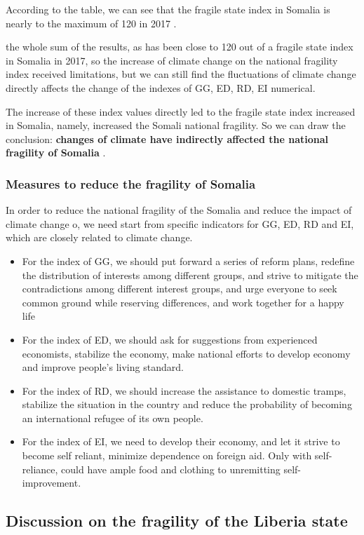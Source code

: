 \documentclass{mcmthesis}
\begin{document}
According to the table, we can see that the fragile state index in Somalia is nearly to the maximum of 120 in 2017 .

the whole sum of the results, as has been close to 120 out of a fragile state index in Somalia in 2017, so the increase of climate change on the national fragility index received limitations, but we can still find the fluctuations of climate change directly affects the change of the indexes of GG, ED, RD, EI numerical. 

 The increase of these index values directly led to the fragile state index increased in Somalia, namely, increased the Somali national fragility. So we can draw the conclusion: \textbf{changes of climate have indirectly affected the national fragility of Somalia} .

\subsubsection{Measures to reduce the fragility of Somalia}
In order to reduce the national fragility of the Somalia and reduce the impact of climate change o, we need start from specific indicators for GG, ED, RD and EI, which are closely related to climate change.

\begin{itemize}
\item	For the index of GG, we should put forward a series of reform plans, redefine the distribution of interests among different groups, and strive to mitigate the contradictions among different interest groups, and urge everyone to seek common ground while reserving differences, and work together for a happy life
\item  	For the index of ED, we should ask for suggestions from experienced economists, stabilize the economy, make national efforts to develop economy and improve people's living standard.
\item	For the index of RD, we should increase the assistance to domestic tramps, stabilize the situation in the country and reduce the probability of becoming an international refugee of its own people.
\item 	For the index of EI, we need to develop their economy, and let it strive to become self reliant, minimize dependence on foreign aid. Only with self-reliance, could have ample food and clothing to unremitting self-improvement.
\end{itemize}

\subsection{Discussion on the fragility of the Liberia state}
\end{document}
